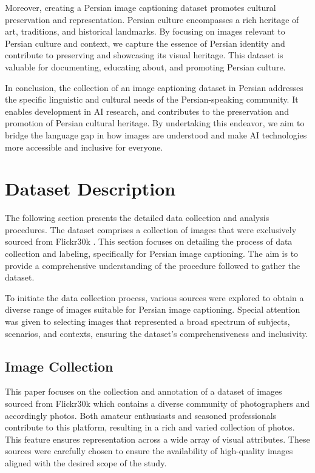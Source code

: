\documentclass[runningheads]{llncs}
\begin{document}
Moreover, creating a Persian image captioning dataset promotes cultural preservation and representation. Persian culture encompasses a rich heritage of art, traditions, and historical landmarks. By focusing on images relevant to Persian culture and context, we capture the essence of Persian identity and contribute to preserving and showcasing its visual heritage. This dataset is valuable for documenting, educating about, and promoting Persian culture.

In conclusion, the collection of an image captioning dataset in Persian addresses the specific linguistic and cultural needs of the Persian-speaking community. It enables development in AI research, and contributes to the preservation and promotion of Persian cultural heritage. By undertaking this endeavor, we aim to bridge the language gap in how images are understood and make AI technologies more accessible and inclusive for everyone.

\section{Dataset Description}
The following section presents the detailed data collection and analysis procedures. The dataset comprises a collection of images that were exclusively sourced from Flickr30k \cite{Flickr30k}. This section focuses on detailing the process of data collection and labeling, specifically for Persian image captioning. The aim is to provide a comprehensive understanding of the procedure followed to gather the dataset.

To initiate the data collection process, various sources were explored to obtain a diverse range of images suitable for Persian image captioning. Special attention was given to selecting images that represented a broad spectrum of subjects, scenarios, and contexts, ensuring the dataset's comprehensiveness and inclusivity.

\subsection{Image Collection}
This paper focuses on the collection and annotation of a dataset of images sourced from Flickr30k \cite{Flickr30k} which contains a diverse community of photographers and accordingly photos. Both amateur enthusiasts and seasoned professionals contribute to this platform, resulting in a rich and varied collection of photos. This feature ensures representation across a wide array of visual attributes. These sources were carefully chosen to ensure the availability of high-quality images aligned with the desired scope of the study.
\end{document}
